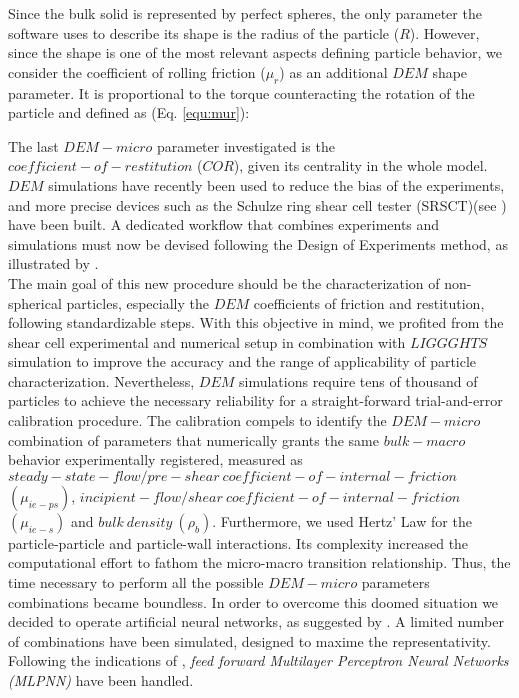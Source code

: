 Since the bulk solid is represented by perfect spheres, the only parameter the software uses to describe its shape is the radius of the particle ($R$).
However, since the shape is one of the most relevant aspects defining particle behavior, we consider the coefficient of rolling friction ($\mu_r$) as an additional $DEM$ shape parameter. 
It is proportional to the torque counteracting the rotation of the particle and defined as (Eq. \ref{equ:mur}):

The last $DEM-micro$ parameter investigated is the $coefficient-of-restitution$ ($COR$), given its centrality in the whole model.
$DEM$ simulations have recently been used to reduce the bias of the experiments, and more precise devices such as the Schulze ring shear cell tester (SRSCT)(see \citet{RefWorks:104}) have been built.
A dedicated workflow that combines experiments and simulations must now be devised following the Design of Experiments method, as illustrated by \citet{RefWorks:116}.\\
The main goal of this new procedure should be the characterization of non-spherical particles, especially the $DEM$ coefficients of friction and restitution, following standardizable steps.
With this objective in mind, we profited from the shear cell experimental and numerical setup in combination with $LIGGGHTS$ simulation to improve the accuracy and the range of applicability of particle characterization.
Nevertheless, $DEM$ simulations require tens of thousand of particles to achieve the necessary reliability for a straight-forward trial-and-error calibration procedure.
The calibration compels to identify the $DEM-micro$ combination of parameters that numerically grants the same $bulk-macro$ behavior experimentally registered, measured as $steady-state-flow/pre-shear ~ coefficient-of-internal-friction $ $ (\mu_{ie-ps})$, $incipient-flow/shear ~ coefficient-of-internal-friction $ $ (\mu_{ie-s})$ and $bulk ~ density ~ (\rho_b)$.
Furthermore, we used Hertz' Law for the particle-particle and particle-wall interactions.
Its complexity increased the computational effort to fathom the micro-macro transition relationship. 
Thus, the time necessary to perform all the possible $DEM-micro$ parameters combinations became boundless.
In order to overcome this doomed situation we decided to operate artificial neural networks, as suggested by \citet{RefWorks:161}.
A limited number of combinations have been simulated, designed to maxime the representativity.
Following the indications of \citet{RefWorks:150}, \textit{feed forward Multilayer Perceptron Neural Networks (MLPNN)} have been handled.
